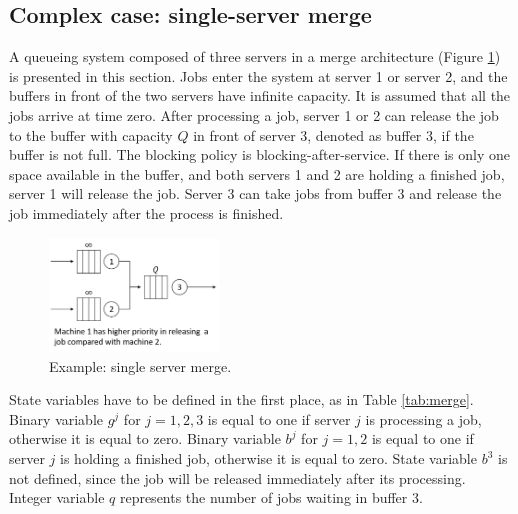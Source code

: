 \documentclass[suppldata]{interact}
\theoremstyle{plain}
\theoremstyle{definition}
\theoremstyle{remark}
\begin{document}
\subsection{Complex case: single-server merge}

A queueing system composed of three servers in a merge architecture (Figure \ref{fig:merge}) is presented in this section. Jobs enter the system at server 1 or server 2, and the buffers in front of the two servers have infinite capacity. It is assumed that all the jobs arrive at time zero. After processing a job, server 1 or 2 can release the job to the buffer with capacity $Q$ in front of server 3, denoted as buffer 3, if the buffer is not full. The blocking policy is blocking-after-service. If there is only one space available in the buffer, and both servers 1 and 2 are holding a finished job, server 1 will release the job. Server 3 can take jobs from buffer 3 and release the job immediately after the process is finished. 

\begin{figure}[h]
	\centering
	\includegraphics[width=0.4\textwidth]{Figures/merge.png}
	\caption{Example: single server merge.}
	\label{fig:merge}
\end{figure}

State variables have to be defined in the first place, as in Table \ref{tab:merge}. Binary variable $g^{j}$ for $j=1,2,3$ is equal to one if server $j$ is processing a job, otherwise it is equal to zero. Binary variable $b^{j}$ for $j=1,2$ is equal to one if server $j$ is holding a finished job, otherwise it is equal to zero. State variable $b^3$ is not defined, since the job will be released immediately after its processing. Integer variable $q$ represents the number of jobs waiting in buffer 3. 
\end{document}
